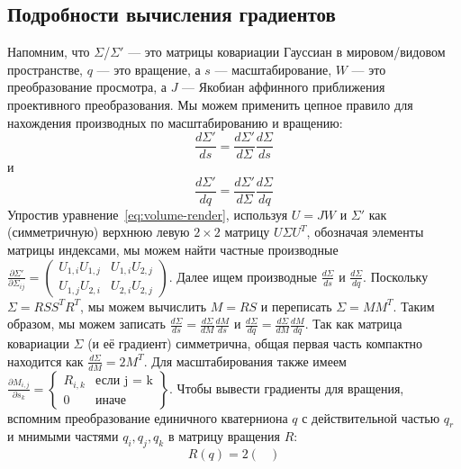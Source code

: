 \begin{appendix}
    \section{Подробности вычисления градиентов}
    \label{sec:appa}
    Напомним, что $\Sigma$/$\Sigma'$ — это матрицы ковариации Гауссиан в мировом/видовом пространстве, $q$ — это вращение, а $s$ — масштабирование, $W$ — это преобразование просмотра, а $J$ — Якобиан аффинного приближения проективного преобразования.
    Мы можем применить цепное правило для нахождения производных по масштабированию и вращению:
    \begin{equation}
        \frac{d\Sigma'}{ds} = \frac{d\Sigma'}{d\Sigma}\frac{d\Sigma}{ds}
    \end{equation}
    и 
    \begin{equation}
        \frac{d\Sigma'}{dq} = \frac{d\Sigma'}{d\Sigma}\frac{d\Sigma}{dq}
    \end{equation}
    Упростив уравнение~\ref{eq:volume-render}, используя $U = JW$ и $\Sigma'$ как (симметричную) верхнюю левую $2\times2$ матрицу $U \Sigma U^T$, обозначая элементы матрицы индексами, мы можем найти частные производные
    $
        \frac{\partial \Sigma'}{\partial \Sigma_{ij}} = \left(\begin{smallmatrix}
            U_{1,i}U_{1,j} & U_{1,i} U_{2,j}\\
            U_{1,j} U_{2,i} & U_{2,i}U_{2,j}
        \end{smallmatrix}\right)
    $.
    Далее ищем производные $\frac{d\Sigma}{ds}$ и $\frac{d\Sigma}{dq}$. Поскольку $\Sigma = RSS^TR^T$, мы можем вычислить $M = RS$ и переписать $\Sigma = MM^T$. Таким образом, мы можем записать $\frac{d\Sigma}{ds} = \frac{d\Sigma}{dM} \frac{dM}{ds}$ и $\frac{d\Sigma}{dq} = \frac{d\Sigma}{dM} \frac{dM}{dq}$. Так как матрица ковариации $\Sigma$ (и её градиент) симметрична, общая первая часть компактно находится как $\frac{d\Sigma}{dM} = 2M^T$. Для масштабирования также имеем
    $	\frac{\partial M_{i,j}}{\partial s_k} =  \left\{\begin{array}{lr}
        R_{i,k} & \text{если j = k}\\
        0 & \text{иначе}
    \end{array}\right\}$.
    Чтобы вывести градиенты для вращения, вспомним преобразование единичного кватерниона $q$ с действительной частью $q_r$ и мнимыми частями $q_i, q_j, q_k$ в матрицу вращения $R$:
    \begin{equation}
        R(q) = 2\begin{pmatrix}

\end{pmatrix}
\end{equation}
\end{appendix}
